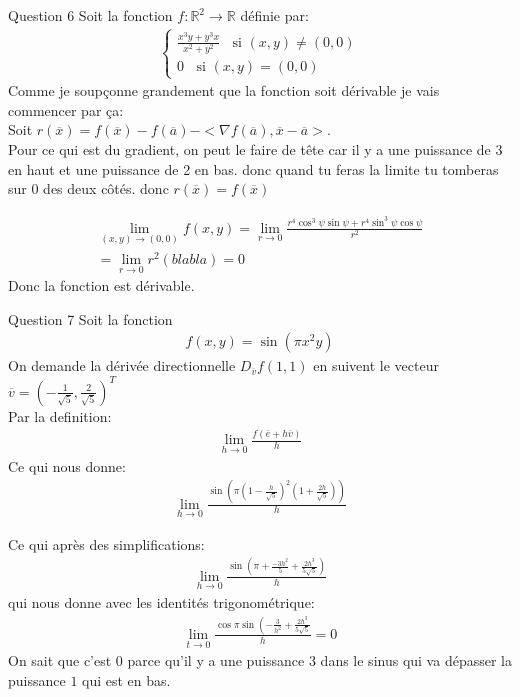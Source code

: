 \begin{parag}{Question 6}
    Soit la fonction $f: \mathbb{R}^2 \to \mathbb{R}$ définie par:
    \begin{align*} 
\begin{cases}
    \frac{x^3y + y^3x}{x^2 + y^2} \; \; \text{ si } \left(x, y\right) \neq \left(0, 0\right)\\
    0  \; \; \text{ si } \left(x, y\right) = \left(0, 0\right)
\end{cases}
    \end{align*}
    Comme je soupçonne grandement que la fonction soit dérivable je vais commencer par ça:\\
 Soit $r\left(\overline{x}\right) = f\left(\overline{x}\right) - f\left(\overline{a}\right) - < \nabla f\left(\overline{a}\right), \overline{x}- \overline{a}>$.\\
 Pour ce qui est du gradient, on peut le faire de tête car il y a une puissance de 3 en haut et une puissance de 2 en bas. donc quand tu feras la limite tu tomberas sur 0 des deux côtés. donc $r\left(\overline{x}\right) =  f\left(\overline{x}\right)$
    
 \begin{align*} \lim_{\left(x, y\right) \to \left(0, 0\right)} f\left(x, y\right) = \lim_{r \to 0} \frac{r^4\cos^3\psi\sin\psi + r^4\sin^3\psi\cos\psi}{r^2}\\
     = \lim_{r \to 0} r^2\left(blabla\right) = 0
\end{align*}
Donc la fonction est dérivable.
\end{parag}
\begin{parag}{Question 7}
    Soit la fonction
    \begin{align*} f\left(x, y\right) = \sin\left(\pi x^2 y\right) \end{align*}
    On demande la dérivée directionnelle $D_{\overline{v}}f\left(1, 1\right)$ en suivent le vecteur $\overline{v} = \left(-\frac{1}{\sqrt{5}}, \frac{2}{\sqrt{5}}\right)^T$\\
    Par la definition:
    \begin{align*} \lim_{h \to 0}\frac{ f\left(\overline{e} + h \overline{v}\right)}{h} \end{align*}
    Ce qui nous donne:
    \begin{align*} \lim_{h \to 0} \frac{\sin\left(\pi\left(1-\frac{h}{\sqrt{5}}\right)^2\left(1 + \frac{2h}{\sqrt{5}}\right)\right)}{h}  \end{align*}

    Ce qui après des simplifications:
    \begin{align*}\lim_{h \to 0} \frac{\sin\left(\pi + \frac{-3h^2}{5} + \frac{2h^3}{5\sqrt{5}}\right)}{h}  \end{align*}
    qui nous donne avec les identités trigonométrique:
    \begin{align*} \lim_{t \to 0} \frac{\cos \pi \sin\left(-\frac{3}{h^2} + \frac{2h^3}{5\sqrt{5}}}{h} = 0 \end{align*}
On sait que c'est $0$ parce qu'il y a une puissance $3$ dans le sinus qui va dépasser la puissance $1$ qui est en bas.
\end{parag}
